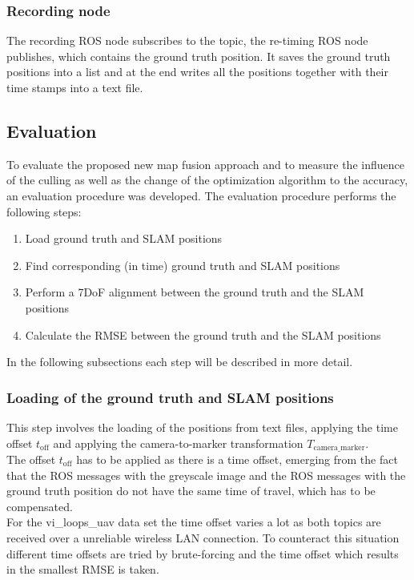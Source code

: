\subsubsection{Recording node}
\label{subsubsec:record_node}
The recording \ac{ROS} node subscribes to the topic, the re-timing \ac{ROS} node publishes, which contains the ground truth position. It saves the ground truth positions into a list and at the end writes all the positions together with their time stamps into a text file.

\subsection{Evaluation}
To evaluate the proposed new map fusion approach and to measure the influence of the culling as well as the change of the optimization algorithm to the accuracy, an evaluation procedure was developed. The evaluation procedure performs the following steps:

\begin{enumerate}
  \item Load ground truth and \ac{SLAM} positions
  \item Find corresponding (in time) ground truth and \ac{SLAM} positions
  \item Perform a 7DoF alignment between the ground truth and the \ac{SLAM} positions
  \item Calculate the \acf{RMSE} between the ground truth and the \ac{SLAM} positions
\end{enumerate}

In the following subsections each step will be described in more detail.

\subsubsection{Loading of the ground truth and \ac{SLAM} positions}
This step involves the loading of the positions from text files, applying the time offset $t_{\text{off}}$ and applying the camera-to-marker transformation $T_{\text{camera\_marker}}$.\\

The offset $t_{\text{off}}$ has to be applied as there is a time offset, emerging from the fact that the \ac{ROS} messages with the greyscale image and the \ac{ROS} messages with the ground truth position do not have the same time of travel, which has to be compensated.\\
For the vi\_loops\_uav data set the time offset varies a lot as both topics are received over a unreliable wireless LAN connection. To counteract this situation different time offsets are tried by brute-forcing and the time offset which results in the smallest \ac{RMSE} is taken.\\ 


